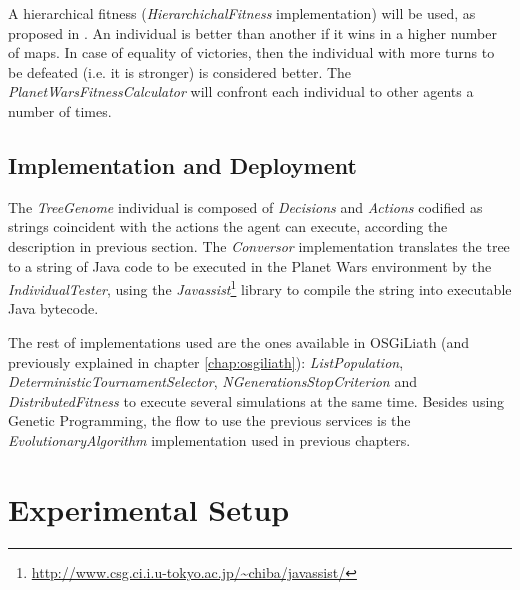 	

A hierarchical fitness ({\em HierarchichalFitness} implementation) will be used, as proposed in \cite{Mora2012Genebot}. An individual is better than another if it wins in a higher number of maps. In case of equality of victories, then the individual with more turns to be defeated (i.e. it is stronger) is considered better. The {\em PlanetWarsFitnessCalculator} will confront each individual to other agents a number of times.

\subsection{Implementation and Deployment}

The {\em TreeGenome} individual is composed of {\em Decisions} and {\em Actions} codified as strings coincident with the actions the agent can execute, according the description in previous section. The {\em Conversor} implementation translates the tree to a string of Java code to be executed in the Planet Wars environment by the {\em IndividualTester}, using the {\em Javassist}\footnote{\url{http://www.csg.ci.i.u-tokyo.ac.jp/~chiba/javassist/}}  library to compile the string into executable Java bytecode.

The rest of implementations used are the ones available in OSGiLiath (and previously explained in chapter \ref{chap:osgiliath}): {\em ListPopulation}, {\em DeterministicTournamentSelector}, {\em NGenerationsStopCriterion} and {\em DistributedFitness} to execute several simulations at the same time. Besides using Genetic Programming, the flow to use the previous services is the {\em EvolutionaryAlgorithm} implementation used in previous chapters.



\section{Experimental Setup}
\label{sec:experiments}

